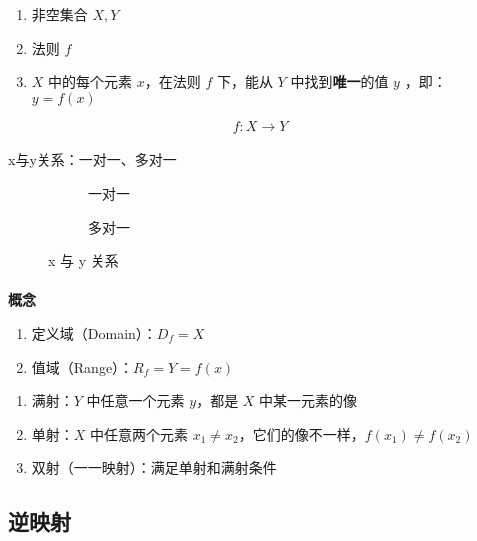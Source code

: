 \begin{enumerate}
  \item 非空集合 $X, Y$
  \item 法则 $f$
  \item $X$ 中的每个元素 $x$，在法则 $f$ 下，能从 $Y$ 中找到\textbf{唯一}的值 $y$ ，即： $y = f(x)$
\end{enumerate}

\begin{equation}
f:X \to Y
\end{equation}

\paragraph{}
x与y关系：一对一、多对一


\begin{figure}[H]
\centering
  \begin{subfigure}[t]{0.4\linewidth}
    \centering
      
      \caption{一对一}
  \end{subfigure}
  \begin{subfigure}[t]{0.4\linewidth}
    \centering
      
      \caption{多对一}
  \end{subfigure}
  \caption{x 与 y 关系}
\end{figure}

\paragraph{}
\textbf{概念}

\begin{enumerate}
  \item 定义域（Domain）：$D_f = X$
  \item 值域（Range）：$R_f = Y = f(x)$
\end{enumerate}

\begin{enumerate}
  \item 满射：$Y$ 中任意一个元素 $y$，都是 $X$ 中某一元素的像
  \item 单射：$X$ 中任意两个元素 $x_1 \neq  x_2$，它们的像不一样，$f(x_1) \neq  f(x_2)$
  \item 双射（一一映射）：满足单射和满射条件
\end{enumerate}

\subsection{逆映射}

